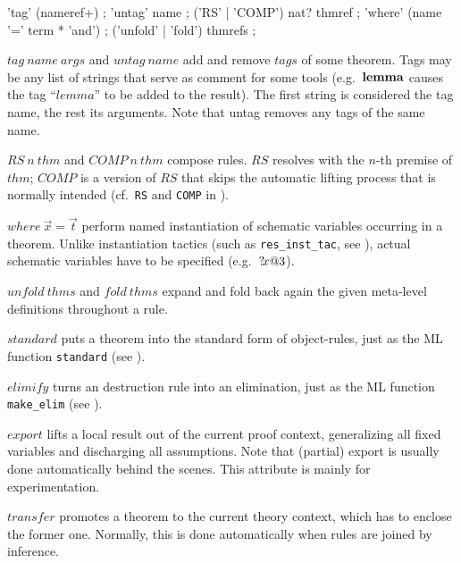 \begin{rail}
  'tag' (nameref+)
  ;
  'untag' name
  ;
  ('RS' | 'COMP') nat? thmref
  ;
  'where' (name '=' term * 'and')
  ;
  ('unfold' | 'fold') thmrefs
  ;
\end{rail}

\begin{descr}
\item [$tag~name~args$ and $untag~name$] add and remove $tags$ of some
  theorem.  Tags may be any list of strings that serve as comment for some
  tools (e.g.\ ${\mathord{\mathbf{lemma}}}$ causes the tag ``$lemma$'' to be added to the
  result).  The first string is considered the tag name, the rest its
  arguments.  Note that untag removes any tags of the same name.
\item [$RS~n~thm$ and $COMP~n~thm$] compose rules.  $RS$ resolves with the
  $n$-th premise of $thm$; $COMP$ is a version of $RS$ that skips the
  automatic lifting process that is normally intended (cf.\ \texttt{RS} and
  \texttt{COMP} in \cite[\S5]{isabelle-ref}).
\item [$where~\vec x = \vec t$] perform named instantiation of schematic
  variables occurring in a theorem.  Unlike instantiation tactics (such as
  \texttt{res_inst_tac}, see \cite{isabelle-ref}), actual schematic variables
  have to be specified (e.g.\ ${?\!x@3}$).
  
\item [$unfold~thms$ and $fold~thms$] expand and fold back again the given
  meta-level definitions throughout a rule.
 
\item [$standard$] puts a theorem into the standard form of object-rules, just
  as the ML function \texttt{standard} (see \cite[\S5]{isabelle-ref}).
  
\item [$elimify$] turns an destruction rule into an elimination, just as the
  ML function \texttt{make\_elim} (see \cite{isabelle-ref}).
  
\item [$export$] lifts a local result out of the current proof context,
  generalizing all fixed variables and discharging all assumptions.  Note that
  (partial) export is usually done automatically behind the scenes.  This
  attribute is mainly for experimentation.
  
\item [$transfer$] promotes a theorem to the current theory context, which has
  to enclose the former one.  Normally, this is done automatically when rules
  are joined by inference.

\end{descr}


